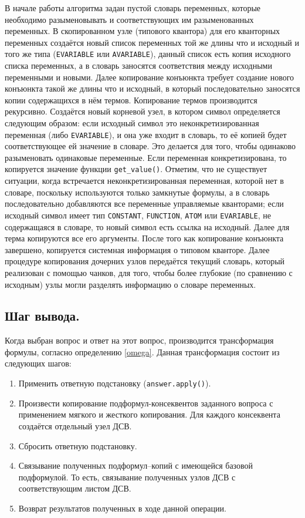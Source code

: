 В начале работы алгоритма задан пустой словарь переменных, которые необходимо разыменовывать и соответствующих им разыменованных переменных. В скопированном узле (типового квантора) для его кванторных переменных создаётся новый список переменных той же длины что и исходный и того же типа (\texttt{EVARIABLE} или \texttt{AVARIABLE}), данный список есть копия исходного списка переменных, а в словарь заносятся соответствия между исходными переменными и новыми. Далее копирование конъюнкта требует создание нового конъюнкта такой же длины что и исходный, в который последовательно заносятся копии содержащихся в нём термов. Копирование термов производится рекурсивно. Создаётся новый корневой узел, в котором символ определяется следующим образом:  если исходный символ это неконкретизированная переменная (либо \texttt{EVARIABLE}), и она уже входит в словарь, то её копией будет соответствующее ей значение в словаре. Это делается для того, чтобы одинаково разыменовать одинаковые переменные. Если переменная конкретизирована, то копируется значение функции {\tt get\_value()}. Отметим, что не существует ситуации, когда встречается неконкретизированная переменная, которой нет в словаре, поскольку используются только замкнутые формулы, а в словарь последовательно добавляются все переменные управляемые кванторами; если исходный символ имеет тип \texttt{CONSTANT}, \texttt{FUNCTION}, \texttt{ATOM} или \texttt{EVARIABLE}, не содержащаяся в словаре, то новый символ есть ссылка на исходный. Далее для терма копируются все его аргументы. После того как копирование конъюнкта завершено, копируется системная информация о типовом кванторе. Далее процедуре копирования дочерних узлов передаётся текущий словарь, который реализован с помощью чанков, для того, чтобы более глубокие (по сравнению с исходным) узлы могли разделять информацию о словаре переменных.


\subsection{Шаг вывода.} Когда выбран вопрос и ответ на этот вопрос, производится трансформация формулы, согласно определению \ref{omega}.
Данная трансформация состоит из следующих шагов:
\begin{enumerate}
\item Применить ответную подстановку (\texttt{answer.apply()}).
\item Произвести копирование подформул-консеквентов заданного вопроса с применением мягкого и жесткого копирования. Для каждого консеквента создаётся отдельный узел ДСВ.
\item Сбросить ответную подстановку.
\item Связывание полученных подформул--копий с имеющейся базовой подформулой. То есть, связывание полученных узлов ДСВ с соответствующим листом ДСВ.
\item Возврат результатов полученных в ходе данной операции.
\end{enumerate}


